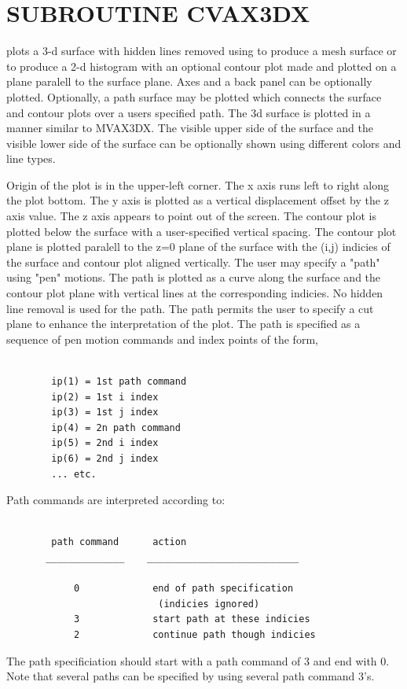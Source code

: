 \documentclass[11pt]{report}
\begin{document}
\section{SUBROUTINE CVAX3DX}

 plots a 3-d surface with hidden lines removed using  to
produce a mesh surface or  to produce a 2-d histogram with an optional
contour plot made  and plotted on a plane paralell to the surface
plane.  Axes and a back panel can be optionally plotted.  Optionally,
a path surface may be plotted which connects the surface and contour plots
over a users specified path.  The 3d surface is plotted in a manner similar
to MVAX3DX.  The visible upper side of the surface and the visible lower
side of the surface can be optionally shown using different colors and
line types.

Origin of the plot is in the upper-left corner.  The x axis runs
left to right along the plot bottom.  The y axis is plotted
as a vertical displacement offset by the z axis value.  The z axis appears
to point out of the screen.  The contour plot is plotted below the surface
with a user-specified vertical spacing.  The contour plot plane is plotted
paralell to the z=0 plane of the surface with the (i,j) indicies of the
surface and contour plot aligned vertically.  The user may specify a
"path" using "pen" motions.  The path is plotted as a curve along the
surface and the contour plot plane with vertical lines at the corresponding
indicies.  No hidden line removal is used for the path.  The path permits
the user to specify a cut plane to enhance the interpretation of the
plot.  The path is specified as a sequence of pen motion commands and
index points of the form,

\begin{verbatim}

        ip(1) = 1st path command
        ip(2) = 1st i index
        ip(3) = 1st j index
        ip(4) = 2n path command
        ip(5) = 2nd i index
        ip(6) = 2nd j index
        ... etc.

\end{verbatim}
Path commands are interpreted according to:
\begin{verbatim}

        path command      action
       ______________    ___________________________

            0             end of path specification
                           (indicies ignored)
            3             start path at these indicies
            2             continue path though indicies

\end{verbatim}
The path specificiation should start with a path command of 3
and end with 0.  Note that several paths can be specified by
using several path command 3's.
\end{document}
